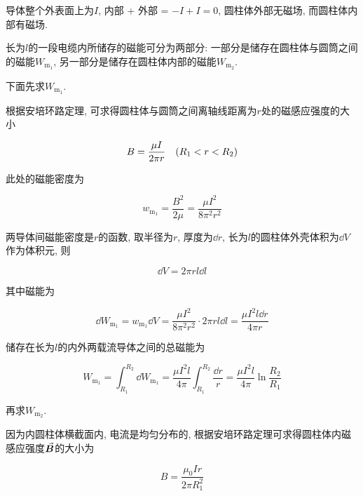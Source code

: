 \begin{example}
	\begin{solution}
		
		导体整个外表面上为$I$, 内部 + 外部 = $-I+I = 0$, 圆柱体外部无磁场, 而圆柱体内部有磁场. 
		
		长为$l$的一段电缆内所储存的磁能可分为两部分: 一部分是储存在圆柱体与圆筒之间的磁能$W_{\textrm{m}_1}$, 另一部分是储存在圆柱体内部的磁能$W_{\textrm{m}_2}$. 
		
		下面先求$W_{\textrm{m}_1}$. 
		
		根据安培环路定理, 可求得圆柱体与圆筒之间离轴线距离为$r$处的磁感应强度的大小
		
		\begin{equation*}
			B = \dfrac{\mu I}{2 \pi r} \quad \qty(R_1 < r < R_2)
		\end{equation*}
		
		此处的磁能密度为
		
		\begin{equation*}
			w_{\textrm{m}_1} = \dfrac{B^2}{2 \mu} = \dfrac{\mu I^2}{8 \pi^2 r^2}
		\end{equation*}
	
		两导体间磁能密度是$r$的函数, 取半径为$r$, 厚度为$\dd{r}$, 长为$l$的圆柱体外壳体积为$\dd{V}$作为体积元, 则
		
		\begin{equation*}
			\dd{V} = 2 \pi r l \dd{l}
		\end{equation*}
		
		其中磁能为
		
		\begin{equation*}
			\dd{W_{\textrm{m}_1}} = w_{\textrm{m}_1} \dd{V} = \dfrac{\mu I^2}{8 \pi^2 r^2} \cdot 2 \pi r l \dd{l} = \dfrac{\mu I^2 l \dd{r}}{4 \pi r}
		\end{equation*}
		
		储存在长为$l$的内外两载流导体之间的总磁能为
		
		\begin{equation*}
			W_{\textrm{m}_1} = \int_{R_1}^{R_2} \dd{W_{\textrm{m}_1}} = \dfrac{\mu I^2 l}{4 \pi} \int_{R_1}^{R_2} \dfrac{\dd{r}}{r} = \dfrac{\mu I^2 l}{4 \pi} \ln \dfrac{R_2}{R_1}
		\end{equation*}
		
		再求$W_{\textrm{m}_2}$. 
		
		因为内圆柱体横截面内, 电流是均匀分布的, 根据安培环路定理可求得圆柱体内磁感应强度$\va*{B}$的大小为
		
		\begin{equation*}
			B = \dfrac{\mu_0 I r}{2 \pi R_1^2}
		\end{equation*}
		

\end{solution}
\end{example}
